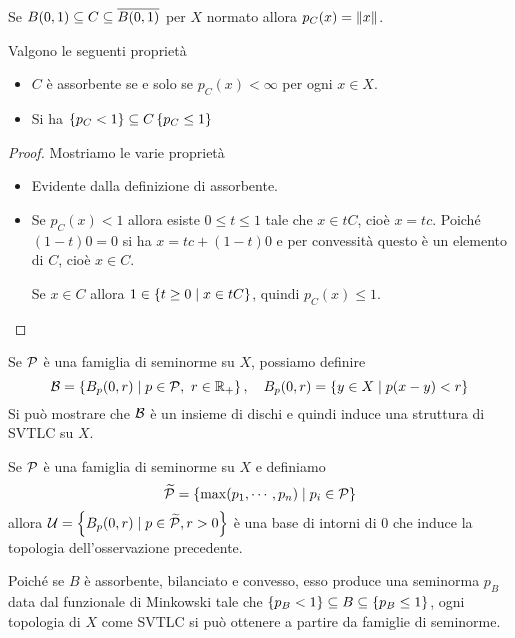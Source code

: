 \begin{remark}
Se $B(0,1)\subseteq C\subseteq \overline{B(0,1)}$ per $X$ normato allora $p_C(x)=\left\Vert{x}\right\Vert$.
\end{remark}

\begin{proposition}\label{PrProprietaFunzionaliMinkowski}
Valgono le seguenti propriet\`a
\begin{itemize}
    \item $C$ \`e assorbente se e solo se $p_C(x)<\infty$ per ogni $x\in X$.
    \item Si ha $\left\{{p_C<1}\right\}\subseteq C\left\{{p_C\leq 1}\right\}$
\end{itemize}
\end{proposition}
\begin{proof}
Mostriamo le varie propriet\`a
\begin{itemize}
    \item Evidente dalla definizione di assorbente.
    \item Se $p_C(x)<1$ allora esiste $0\leq t\leq 1$ tale che $x\in tC$, cio\`e $x=tc$. Poich\'e $(1-t)0=0$ si ha $x=tc+(1-t)0$ e per convessit\`a questo \`e un elemento di $C$, cio\`e $x\in C$.
    
    Se $x\in C$ allora $1\in \left\{{t\geq 0\mid x\in tC}\right\}$, quindi $p_C(x)\leq 1$.
\end{itemize}
\end{proof}


\begin{remark}
    Se $\mathcal{P}$ \`e una famiglia di seminorme su $X$, possiamo definire
    \[\mathcal{B}=\left\{{B_p(0,r)\mid p\in\mathcal{P},\ r\in \mathbb{R}_+}\right\},\quad B_p(0,r)=\left\{{y\in X\mid p(x-y)<r}\right\}\]
    Si pu\`o mostrare che $\mathcal{B}$ \`e un insieme di dischi e quindi induce una struttura di SVTLC su $X$.
\end{remark}

\begin{remark}
Se $\mathcal{P}$ \`e una famiglia di seminorme su $X$ e definiamo
\[\widetilde{\mathcal{P}}=\left\{{\max (p_1,\cdots, p_n)\mid p_i\in \mathcal{P}}\right\}\]
allora $\mathcal{U}=\left\{{B_p(0,r)\mid p\in\widetilde{\mathcal{P}},r>0}\right\}$ \`e una base di intorni di $0$ che induce la topologia dell'osservazione precedente.
\end{remark}

\begin{remark}\label{RmOgniSVTLCDerivaDaSeminorme}
Poich\'e se $B$ \`e assorbente, bilanciato e convesso, esso produce una seminorma $p_B$ data dal funzionale di Minkowski tale che $\left\{{p_B<1}\right\}\subseteq B\subseteq \left\{{p_B\leq 1}\right\}$, ogni topologia di $X$ come SVTLC si pu\`o ottenere a partire da famiglie di seminorme.
\end{remark}

